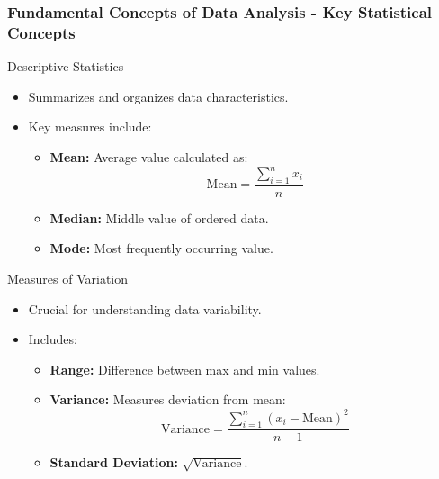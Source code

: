 \documentclass{beamer}
\begin{document}
\begin{frame}[fragile]
    \frametitle{Fundamental Concepts of Data Analysis - Key Statistical Concepts}
    \begin{block}{Descriptive Statistics}
        \begin{itemize}
            \item Summarizes and organizes data characteristics.
            \item Key measures include:
            \begin{itemize}
                \item \textbf{Mean:} Average value calculated as:
                \begin{equation}
                \text{Mean} = \frac{\sum_{i=1}^{n} x_i}{n}
                \end{equation}
                \item \textbf{Median:} Middle value of ordered data.
                \item \textbf{Mode:} Most frequently occurring value.
            \end{itemize}
        \end{itemize}
    \end{block}
    
    \begin{block}{Measures of Variation}
        \begin{itemize}
            \item Crucial for understanding data variability.
            \item Includes:
            \begin{itemize}
                \item \textbf{Range:} Difference between max and min values.
                \item \textbf{Variance:} Measures deviation from mean:
                \begin{equation}
                \text{Variance} = \frac{\sum_{i=1}^{n} (x_i - \text{Mean})^2}{n-1}
                \end{equation}
                \item \textbf{Standard Deviation:} $\sqrt{\text{Variance}}$.
            \end{itemize}
        \end{itemize}
    \end{block}
\end{frame}
\end{document}
